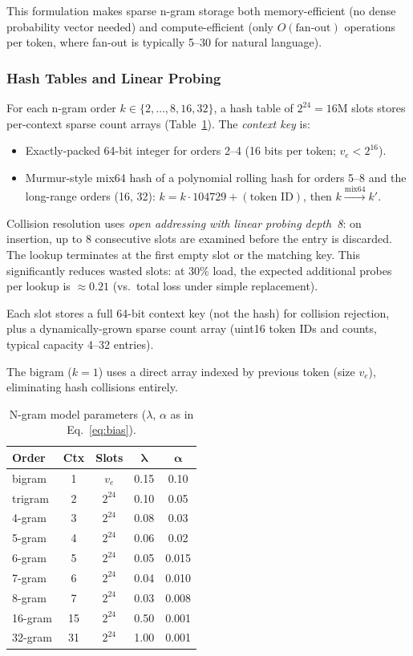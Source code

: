 \documentclass[10pt,twocolumn]{article}
\begin{document}
This formulation makes sparse n-gram storage both memory-efficient
(no dense probability vector needed) and compute-efficient (only
$O(\text{fan-out})$ operations per token, where fan-out is typically
5--30 for natural language).

\subsubsection{Hash Tables and Linear Probing}

For each n-gram order $k\in\{2,\ldots,8,16,32\}$, a hash table of
$2^{24}=16\text{M}$ slots stores per-context sparse count arrays
(Table~\ref{tab:ngrams}).  The \emph{context key} is:
\begin{itemize}
  \item Exactly-packed 64-bit integer for orders 2--4 (16 bits per
    token; $v_e < 2^{16}$).
  \item Murmur-style mix64 hash of a polynomial rolling hash for
    orders 5--8 and the long-range orders (16, 32):
    $k = k \cdot 104729 + (\text{token ID})$,
    then $k \xrightarrow{\text{mix64}} k'$.
\end{itemize}
Collision resolution uses \emph{open addressing with linear probing
depth~8}: on insertion, up to 8 consecutive slots are examined
before the entry is discarded.  The lookup terminates at the first
empty slot or the matching key.  This significantly reduces wasted
slots: at 30\% load, the expected additional probes per lookup is
${\approx}0.21$ (vs.\ total loss under simple replacement).

Each slot stores a full 64-bit context key (not the hash) for
collision rejection, plus a dynamically-grown sparse count array
(uint16 token IDs and counts, typical capacity 4--32 entries).

The bigram ($k=1$) uses a direct array indexed by previous token
(size $v_e$), eliminating hash collisions entirely.

\begin{table}[h]
\centering
\small
\caption{N-gram model parameters ($\lambda$, $\alpha$ as in Eq.~\ref{eq:bias}).}
\label{tab:ngrams}
\begin{tabular}{@{}lcccc@{}}
\toprule
\textbf{Order} & \textbf{Ctx} & \textbf{Slots} & $\boldsymbol{\lambda}$ & $\boldsymbol{\alpha}$ \\
\midrule
bigram  & 1 & $v_e$ & 0.15 & 0.10 \\
trigram & 2 & $2^{24}$ & 0.10 & 0.05 \\
4-gram  & 3 & $2^{24}$ & 0.08 & 0.03 \\
5-gram  & 4 & $2^{24}$ & 0.06 & 0.02 \\
6-gram  & 5 & $2^{24}$ & 0.05 & 0.015 \\
7-gram  & 6 & $2^{24}$ & 0.04 & 0.010 \\
8-gram  & 7 & $2^{24}$ & 0.03 & 0.008 \\
\midrule
16-gram & 15 & $2^{24}$ & 0.50 & 0.001 \\
32-gram & 31 & $2^{24}$ & 1.00 & 0.001 \\
\bottomrule
\end{tabular}
\end{table}
\end{document}
